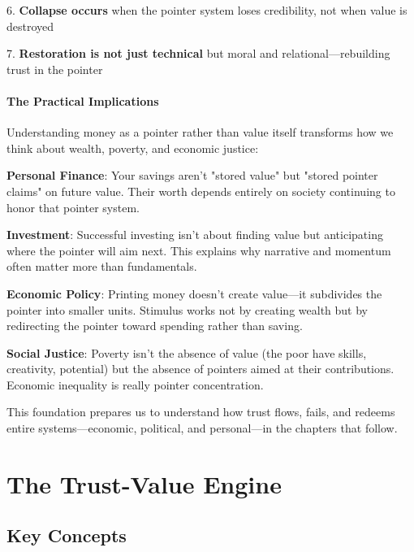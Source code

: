 \documentclass[11pt,oneside]{book}
\begin{document}
6. \textbf{Collapse occurs} when the pointer system loses credibility, not when value is destroyed


7. \textbf{Restoration is not just technical} but moral and relational—rebuilding trust in the pointer


\subsubsection{The Practical Implications}

Understanding money as a pointer rather than value itself transforms how we think about wealth, poverty, and economic justice:

\textbf{Personal Finance}: Your savings aren't "stored value" but "stored pointer claims" on future value. Their worth depends entirely on society continuing to honor that pointer system.

\textbf{Investment}: Successful investing isn't about finding value but anticipating where the pointer will aim next. This explains why narrative and momentum often matter more than fundamentals.

\textbf{Economic Policy}: Printing money doesn't create value—it subdivides the pointer into smaller units. Stimulus works not by creating wealth but by redirecting the pointer toward spending rather than saving.

\textbf{Social Justice}: Poverty isn't the absence of value (the poor have skills, creativity, potential) but the absence of pointers aimed at their contributions. Economic inequality is really pointer concentration.

This foundation prepares us to understand how trust flows, fails, and redeems entire systems—economic, political, and personal—in the chapters that follow.


\chapter{ The Trust-Value Engine}

\section{Key Concepts}
\end{document}

